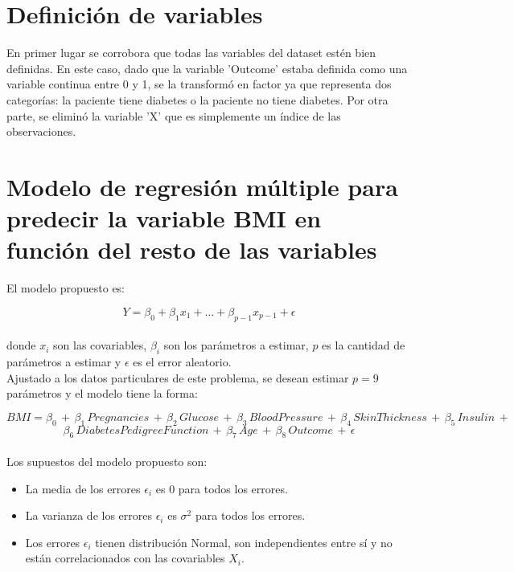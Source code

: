 \documentclass{article}
\begin{document}
\section{Definición de variables}

En primer lugar se corrobora que todas las variables del dataset estén bien definidas. En este caso, dado que la variable 'Outcome' estaba definida como una variable continua entre 0 y 1, se la transformó en factor ya que representa dos categorías: la paciente tiene diabetes o la paciente no tiene diabetes. Por otra parte, se eliminó la variable 'X' que es simplemente un índice de las observaciones.





\section{Modelo de regresión múltiple para predecir la variable BMI en función del resto de las variables}

El modelo propuesto es:

$$Y = \beta_0 + \beta_1 x_1 + ... + \beta_{p-1} x_{p-1} + \epsilon$$\\

\noindent
donde \(x_i\) son las covariables, \(\beta_i\) son los parámetros a estimar, \(p\) es la cantidad de parámetros a estimar y \(\epsilon\)
 es el error aleatorio.\\

\noindent
Ajustado a los datos particulares de este problema, se desean estimar \(p = 9\) parámetros y el modelo tiene la forma:

$$BMI = \beta_0 \, + \, \beta_1 \, Pregnancies \, + \, \beta_2 \, Glucose \, + \, \beta_3 \, BloodPressure \, + \, \beta_4 \, SkinThickness \,
+ \, \beta_5 \, Insulin  \, + $$
$$\beta_6 \, DiabetesPedigreeFunction \, + \, \beta_7 \, Age \, + \, \beta_8 \, Outcome \, + \, \epsilon $$\\

\noindent
Los supuestos del modelo propuesto son:
\begin{itemize}
\item La media de los errores \(\epsilon_i\) es 0 para todos los errores.
\item La varianza de los errores \(\epsilon_i\) es \(\sigma^2\) para todos los errores.
\item Los errores \(\epsilon_i\) tienen distribución Normal, son independientes entre sí y no están correlacionados con las covariables \(X_i\).
\end{itemize}
\end{document}
